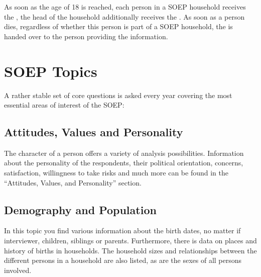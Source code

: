 \documentclass[letterpaper,10pt,openany,onesideH,english]{sphinxmanual}
\begin{document}
As soon as the age of 18 is reached, each person in a SOEP household receives the {\hyperref[\detokenize{Contents of SOEPcore/index:individual-questionnaire}]{}}, the head of the household additionally receives the {\hyperref[\detokenize{Contents of SOEPcore/index:household-questionnaire}]{}}. As soon as a person dies, regardless of whether this person is part of a SOEP household, the {\hyperref[\detokenize{Contents of SOEPcore/index:deceased-persons-questionnaire}]{}} is handed over to the person providing the information.


\section{SOEP Topics}
\label{\detokenize{Contents of SOEPcore/index:soep-topics}}
A rather stable set of core questions is asked every year covering the most essential areas of interest of the SOEP:


\subsection{Attitudes, Values and Personality}
\label{\detokenize{Contents of SOEPcore/index:attitudes-values-and-personality}}
The character of a person offers a variety of analysis possibilities. Information about the personality of the respondents, their political orientation, concerns, satisfaction, willingness to take risks and much more can be found in the “Attitudes, Values, and Personality” section.

\begin{figure}[H]
\centering
{}\end{figure}


\subsection{Demography and Population}
\label{\detokenize{Contents of SOEPcore/index:demography-and-population}}
In this topic you find various information about the birth dates, no matter if interviewer, children, siblings or parents. Furthermore, there is data on places and history of births in households. The household sizes and relationships between the different persons in a household are also listed, as are the     sexes of all persons involved.
\end{document}
